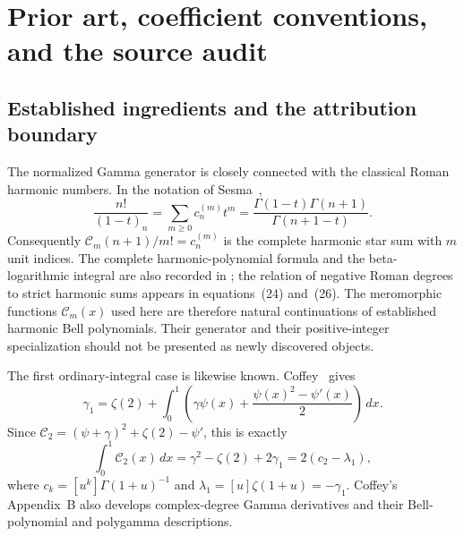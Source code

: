 \documentclass[11pt,a4paper]{article}
\numberwithin{equation}{section}
\theoremstyle{definition}
\begin{document}

\section{Prior art, coefficient conventions, and the source audit}
\label{sec:normalizer-prior-art-audit}

\subsection{Established ingredients and the attribution boundary}

The normalized Gamma generator is closely connected with the
classical Roman harmonic numbers.  In the notation of
Sesma~\cite[Proposition~3(a), equation~(49)]{Sesma},
\begin{equation}
 \frac{n!}{(1-t)_n}=\sum_{m\geq0}c_n^{(m)}t^m
       =\frac{\Gamma(1-t)\Gamma(n+1)}{\Gamma(n+1-t)}.
 \label{eq:audit-roman-generator}
\end{equation}
Consequently $\mathcal C_m(n+1)/m!=c_n^{(m)}$ is the complete harmonic
star sum with $m$ unit indices.  The complete harmonic-polynomial
formula and the beta-logarithmic integral are also recorded in
\cite[equations~(29)--(30)]{Sesma}; the relation of negative Roman
degrees to strict harmonic sums appears in equations~(24) and~(26).
The meromorphic functions $\mathcal C_m(x)$ used here are therefore natural
continuations of established harmonic Bell polynomials.  Their
generator and their positive-integer specialization should not
be presented as newly discovered objects.

The first ordinary-integral case is likewise known.
Coffey~\cite[Proposition~3(b), equation~(1.19)]{Coffey} gives
\begin{equation}
 \gamma_1=\zeta(2)+\int_0^1
       \left(\gamma\psi(x)
          +\frac{\psi(x)^2-\psi'(x)}{2}\right)\,dx.
 \label{eq:audit-coffey-first-case}
\end{equation}
Since $\mathcal C_2=(\psi+\gamma)^2+\zeta(2)-\psi'$, this is exactly
\begin{equation}
 \int_0^1 \mathcal C_2(x)\,dx
       =\gamma^2-\zeta(2)+2\gamma_1
       =2(c_2-\lambda_1),
 \label{eq:audit-coffey-normalized-case}
\end{equation}
where $c_k=[u^k]\Gamma(1+u)^{-1}$ and
$\lambda_1=[u]\zeta(1+u)=-\gamma_1$.
Coffey's Appendix~B also develops complex-degree Gamma derivatives
and their Bell-polynomial and polygamma descriptions.
\end{document}
